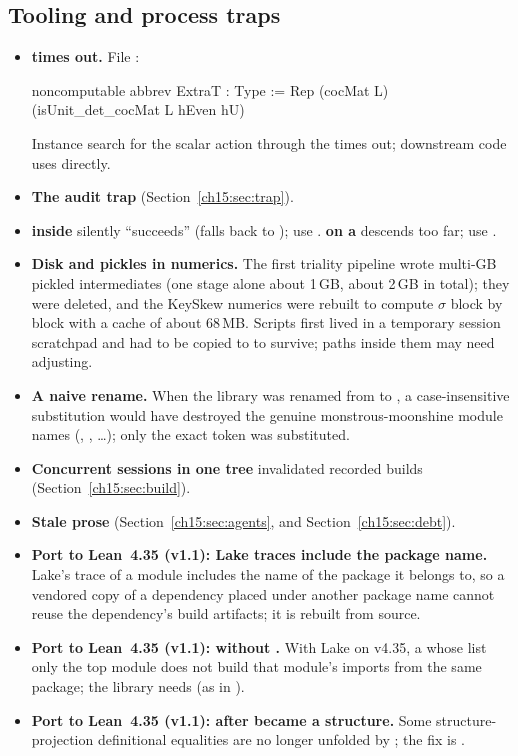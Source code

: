 \subsection{Tooling and process traps}\label{ch15:sec:tooling}
\begin{itemize}
\item \textbf{ times out.} File :
\begin{leancode}
noncomputable abbrev ExtraT : Type := Rep (cocMat L) (isUnit_det_cocMat L hEven hU)
\end{leancode}
  Instance search for the scalar action through the  times out; downstream code uses
   directly.
\item \textbf{The audit trap}  (Section~\ref{ch15:sec:trap}).
\item \textbf{ inside } silently ``succeeds'' (falls back to );
  use . \textbf{ on a } descends too far; use
  .
\item \textbf{Disk and pickles in numerics.} The first triality pipeline wrote multi-GB pickled
  intermediates (one stage alone about 1\,GB, about 2\,GB in total); they were deleted, and the
  KeySkew numerics were rebuilt to compute $\sigma$ block by block with a cache of about 68\,MB. Scripts
  first lived in a temporary session scratchpad and had to be copied to
   to survive; paths inside them may need adjusting.
\item \textbf{A naive rename.} When the library was renamed from  to , a case-insensitive substitution would have destroyed the genuine
  monstrous-moonshine module names (, , \ldots);
  only the exact token was substituted.
\item \textbf{Concurrent sessions in one tree} invalidated recorded builds
  (Section~\ref{ch15:sec:build}).
\item \textbf{Stale prose} (Section~\ref{ch15:sec:agents}, and Section~\ref{ch15:sec:debt}).
\item \textbf{Port to Lean~4.35 (v1.1): Lake traces include the package name.} Lake's trace of a module includes the name
  of the package it belongs to, so a vendored copy of a dependency placed under another package name cannot reuse the
  dependency's build artifacts; it is rebuilt from source.
\item \textbf{Port to Lean~4.35 (v1.1):  without .} With Lake on v4.35, a  whose
   list only the top module does not build that module's imports from the same package; the library needs
   (as in ).
\item \textbf{Port to Lean~4.35 (v1.1):  after  became a structure.} Some
  structure-projection definitional equalities are no longer unfolded by ; the fix is
  .
\end{itemize}

